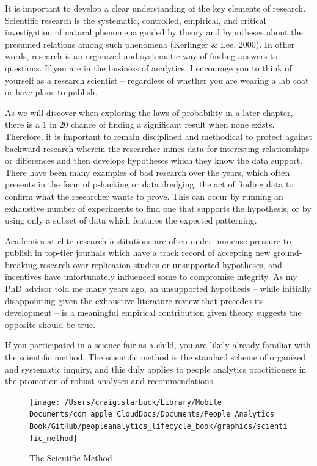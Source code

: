 \documentclass[
]{book}
\begin{document}
It is important to develop a clear understanding of the key elements of research. Scientific research is the systematic, controlled, empirical, and critical investigation of natural phenomena guided by theory and hypotheses about the presumed relations among such phenomena (Kerlinger \& Lee, 2000). In other words, research is an organized and systematic way of finding answers to questions. If you are in the business of analytics, I encourage you to think of yourself as a research scientist -- regardless of whether you are wearing a lab coat or have plans to publish.

As we will discover when exploring the laws of probability in a later chapter, there is a 1 in 20 chance of finding a significant result when none exists. Therefore, it is important to remain disciplined and methodical to protect against backward research wherein the researcher mines data for interesting relationships or differences and then develops hypotheses which they know the data support. There have been many examples of bad research over the years, which often presents in the form of p-hacking or data dredging: the act of finding data to confirm what the researcher wants to prove. This can occur by running an exhaustive number of experiments to find one that supports the hypothesis, or by using only a subset of data which features the expected patterning.

Academics at elite research institutions are often under immense pressure to publish in top-tier journals which have a track record of accepting new ground-breaking research over replication studies or unsupported hypotheses, and incentives have unfortunately influenced some to compromise integrity. As my PhD advisor told me many years ago, an unsupported hypothesis -- while initially disappointing given the exhaustive literature review that precedes its development -- is a meaningful empirical contribution given theory suggests the opposite should be true.

If you participated in a science fair as a child, you are likely already familiar with the scientific method. The scientific method is the standard scheme of organized and systematic inquiry, and this duly applies to people analytics practitioners in the promotion of robust analyses and recommendations.

\begin{figure}

{\centering \texttt{[image: /Users/craig.starbuck/Library/Mobile Documents/com~apple~CloudDocs/Documents/People Analytics Book/GitHub/peopleanalytics\_lifecycle\_book/graphics/scientific\_method]} 

}

\caption{The Scientific Method}\label{fig:sci-method}
\end{figure}
\end{document}
